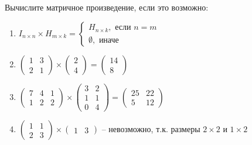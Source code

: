 \documentclass[11pt, a4paper]{extarticle}
\begin{document}
\subsection{}
Вычислите матричное произведение, если это возможно:
	\begin{enumerate}[label=\alph*)]
		
		\item $I_{n \times n} \times H_{m\times k} = \begin{cases}
		H_{n\times k}, \text{ если } n = m \\
		\emptyset, \text{ иначе}
		\end{cases}$
		
		\item $\begin{pmatrix}
			1 & 3 \\
			2 & 1 
		\end{pmatrix} \times \begin{pmatrix}
		2 \\ 4
		\end{pmatrix}  = \begin{pmatrix}
		14 \\ 8
		\end{pmatrix}$
		
		\item $\begin{pmatrix}
		7 & 4 & 1 \\
		1 & 2 & 2
		\end{pmatrix} \times \begin{pmatrix}
		3 & 2 \\
		1 & 1 \\
		0 & 4
		\end{pmatrix} = \begin{pmatrix}
		25  & 22 \\
		5 & 12
		\end{pmatrix}$
		
		\item $\begin{pmatrix}
		1 & 1 \\
		2 & 3
		\end{pmatrix} \times \begin{pmatrix}
		1 & 3
		\end{pmatrix}$ – невозможно, т.к. размеры $2\times2$ и $1\times2$
		

\end{enumerate}
\end{document}
